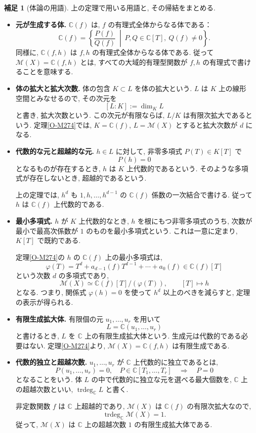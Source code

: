 \documentclass[dvipdfmx,a4paper,11pt]{article} %
\newcommand{\C}{\mathbb{C}}
\theoremstyle{definition}
\numberwithin{equation}{section}
\newtheorem{rem}[thm]{補足}
\begin{document}
\begin{rem}[体論の用語]
上の定理で用いる用語と, その帰結をまとめる.
\begin{itemize}
\item \textbf{元が生成する体.}
$\C(f)$ は, $f$ の有理式全体からなる体である：
\[
\C(f)=\left\{
\frac{P(f)}{Q(f)}
\ \middle|\
P,Q\in\C[T],\ Q(f)\neq0
\right\}.
\]
同様に, $\C(f,h)$ は $f,h$ の有理式全体からなる体である.
従って $\mathcal M(X)=\C(f,h)$ とは,
すべての大域的有理型関数が $f,h$ の有理式で書けることを意味する.

\item \textbf{体の拡大と拡大次数.}
体の包含 $K\subset L$ を体の拡大という.
$L$ は $K$ 上の線形空間とみなせるので, その次元を
\[
[L:K]:=\dim_K L
\]
と書き, 拡大次数という.
この次元が有限ならば, $L/K$ は有限次拡大であるという.
定理\ref{O-M274}では,
$K=\C(f)$, $L=\mathcal M(X)$ とすると拡大次数が $d$ になる.

\item \textbf{代数的な元と超越的な元.}
$h\in L$ に対して, 非零多項式 $P(T)\in K[T]$ で
\[
P(h)=0
\]
となるものが存在するとき, $h$ は $K$ 上代数的であるという.
そのような多項式が存在しないとき, 超越的であるという.

上の定理では, $h^d$ も $1,h,\ldots,h^{d-1}$ の
$\C(f)$ 係数の一次結合で書ける.
従って $h$ は $\C(f)$ 上代数的である.

\item \textbf{最小多項式.}
$h$ が $K$ 上代数的なとき,
$h$ を根にもつ非零多項式のうち,
次数が最小で最高次係数が $1$ のものを最小多項式という.
これは一意に定まり, $K[T]$ で既約である.

定理\ref{O-M274}の $h$ の $\C(f)$ 上の最小多項式は,
\[
\varphi(T)=T^d+a_{d-1}(f)T^{d-1}+\cdots+a_0(f)
\in\C(f)[T]
\]
という次数 $d$ の多項式であり,
\[
\mathcal M(X)\simeq\C(f)[T]/(\varphi(T)),
\qquad [T]\longmapsto h
\]
となる.
つまり, 関係式 $\varphi(h)=0$ を使って
$h^d$ 以上のべきを減らすと,
定理の表示が得られる.

\item \textbf{有限生成拡大体.}
有限個の元 $u_1,\ldots,u_r$ を用いて
\[
L=\C(u_1,\ldots,u_r)
\]
と書けるとき, $L$ を $\C$ 上の有限生成拡大体という.
生成元は代数的である必要はない.
定理\ref{O-M274}より, $\mathcal M(X)=\C(f,h)$ は有限生成である.

\item \textbf{代数的独立と超越次数.}
$u_1,\ldots,u_r$ が $\C$ 上代数的に独立であるとは,
\[
P(u_1,\ldots,u_r)=0,\quad
P\in\C[T_1,\ldots,T_r]
\quad\Longrightarrow\quad P=0
\]
となることをいう.
体 $L$ の中で代数的に独立な元を選べる最大個数を,
$\C$ 上の超越次数といい, $\operatorname{trdeg}_{\C}L$ と書く.

非定数関数 $f$ は $\C$ 上超越的であり,
$\mathcal M(X)$ は $\C(f)$ の有限次拡大なので,
\[
\operatorname{trdeg}_{\C}\mathcal M(X)=1.
\]
従って, $\mathcal M(X)$ は
$\C$ 上の超越次数 $1$ の有限生成拡大体である.
\end{itemize}
\end{rem}
\end{document}
